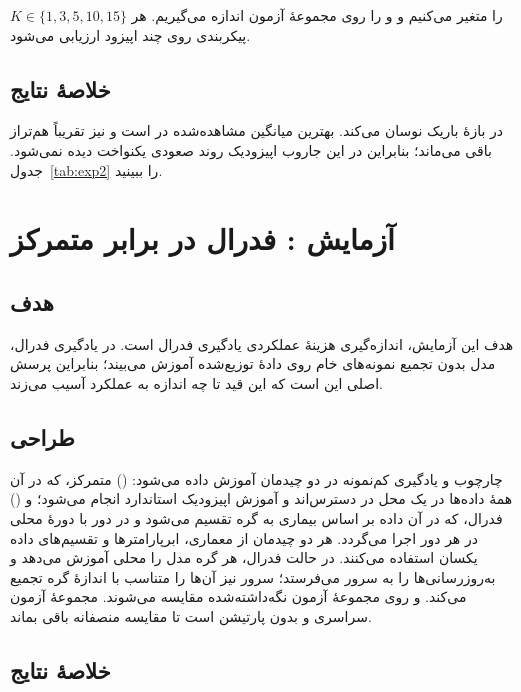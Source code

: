 $K \in \{1, 3, 5, 10, 15\}$ را متغیر می‌کنیم و  و  را روی مجموعۀ آزمون اندازه می‌گیریم. هر پیکربندی روی چند اپیزود ارزیابی می‌شود.

\subsection{خلاصۀ نتایج}

 در بازۀ باریک  نوسان می‌کند. بهترین میانگین مشاهده‌شده  در  است و  نیز تقریباً هم‌تراز باقی می‌ماند؛ بنابراین در این جاروب اپیزودیک روند صعودی یکنواخت دیده نمی‌شود. جدول~\ref{tab:exp2} را ببینید.

\section{آزمایش : فدرال در برابر متمرکز}

\subsection{هدف}

هدف این آزمایش، اندازه‌گیری هزینۀ عملکردی یادگیری فدرال است. در یادگیری فدرال، مدل بدون تجمیع نمونه‌های خام روی دادۀ توزیع‌شده آموزش می‌بیند؛ بنابراین پرسش اصلی این است که این قید تا چه اندازه به عملکرد آسیب می‌زند.

\subsection{طراحی}

چارچوب  و یادگیری کم‌نمونه در دو چیدمان آموزش داده می‌شود: () متمرکز، که در آن همۀ داده‌ها در یک محل در دسترس‌اند و آموزش اپیزودیک استاندارد انجام می‌شود؛ و () فدرال، که در آن داده بر اساس بیماری به  گره تقسیم می‌شود و  در  دور با  دورۀ محلی در هر دور اجرا می‌گردد. هر دو چیدمان از معماری، ابرپارامترها و تقسیم‌های داده یکسان استفاده می‌کنند. در حالت فدرال، هر گره مدل را محلی آموزش می‌دهد و به‌روزرسانی‌ها را به سرور می‌فرستد؛ سرور نیز آن‌ها را متناسب با اندازۀ گره تجمیع می‌کند.  و  روی مجموعۀ آزمون نگه‌داشته‌شده مقایسه می‌شوند. مجموعۀ آزمون سراسری و بدون پارتیشن است تا مقایسه منصفانه باقی بماند.

\subsection{خلاصۀ نتایج}

